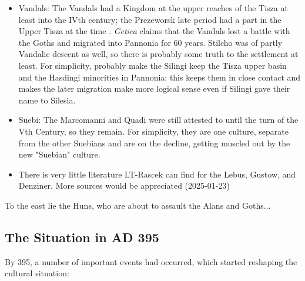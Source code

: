 \documentclass{article}
\begin{document}
\begin{itemize}
		\item Vandals:\newline
		The Vandals had a Kingdom at the upper reaches of the Tisza at least into the IVth century; the Prezeworsk late period had a part in the Upper Tisza at the time \cite{PrzeworskHistory}.\newline
		\textit{Getica} claims that the Vandals lost a battle with the Goths and migrated into Pannonia for 60 years.\newline
		Stilcho was of partly Vandalic descent as well, so there is probably some truth to the settlement at least.\newline
		For simplicity, probably make the Silingi keep the Tisza upper basin and the Hasdingi minorities in Pannonia; this keeps them in close contact and makes the later  migration make more logical sense even if Silingi gave their name to Silesia.
		
		\item Suebi:
		The Marcomanni and Quadi were still attested to until the turn of the Vth Century, so they remain. 
		For simplicity, they are one culture, separate from the other Suebians and are on the decline, getting muscled out by the new "Suebian" culture.
		
		\item There is very little literature LT-Rascek can find for the Lebus, Gustow, and Denziner.
		More sources would be appreciated (2025-01-23)
	\end{itemize}
	
	To the east lie the Huns, who are about to assault the Alans and Goths...
	
	\newpage
	\subsection{The Situation in AD 395}
	\label{sec:timeline:subsec:395}
	By 395, a number of important events had occurred, which started reshaping the cultural situation:
	
\end{document}
